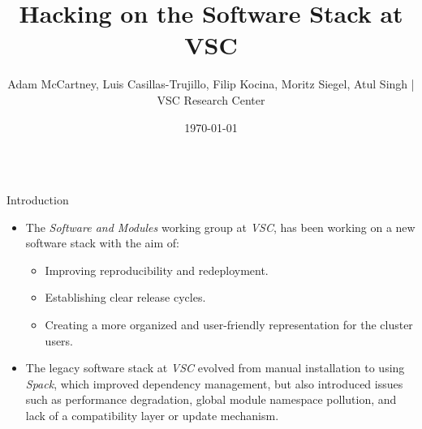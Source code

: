 \documentclass[final]{beamer}
\title{Hacking on the Software Stack at VSC}
\author{Adam McCartney, Luis Casillas-Trujillo, Filip Kocina, Moritz Siegel,
Atul Singh
\quad | \quad VSC Research Center}
\date{\today}
\begin{document}
\begin{frame}[t]

\begin{center}
  \vspace{1cm}
  \Huge \textbf{\inserttitle}
  
  \vspace{0.5cm}
  \Large \insertauthor
  
  \vspace{1cm}
\end{center}



\def\vsc{\textit{VSC}}
\def\sam{\textit{Software and Modules}}
\def\platform{\textit{Platform}}
\def\musica{\textit{MUSICA}}
\def\support{\textit{Support}}
\def\sysadmin{\textit{Sysadmin}}

\def\cern{\textit{CERN}}
\def\cvmfs{\textit{CVMFS}}
\def\easybuild{\textit{EasyBuild}}
\def\eessi{\textit{EESSI}}
\def\gentoo{\textit{gentoo}}
\def\guix{\textit{guix}}
\def\lmod{\textit{Lmod}}
\def\nix{\textit{nix}}
\def\reframe{\textit{ReFrame}}
\def\spack{\textit{Spack}}
\def\sse{\textit{sse2}}

\begin{columns}[t]
  \begin{column}{0.48\textwidth}

    \begin{block}{Introduction}
        \begin{itemize}
          \item The \sam{} working group at \vsc{}, has been working on a new
              software stack with the aim of:
          \begin{itemize}
             \item Improving reproducibility and redeployment.
             \item Establishing clear release cycles.
             \item Creating a more organized and user-friendly representation for the cluster users.
          \end{itemize} 


          \item The legacy software stack at \vsc{} evolved from manual
          installation to using \spack{}, which improved dependency
          management, but also introduced issues such as performance
          degradation, global module namespace pollution, and lack of a
          compatibility layer or update mechanism.


\end{itemize}
\end{block}
\end{column}
\end{columns}
\end{frame}
\end{document}
